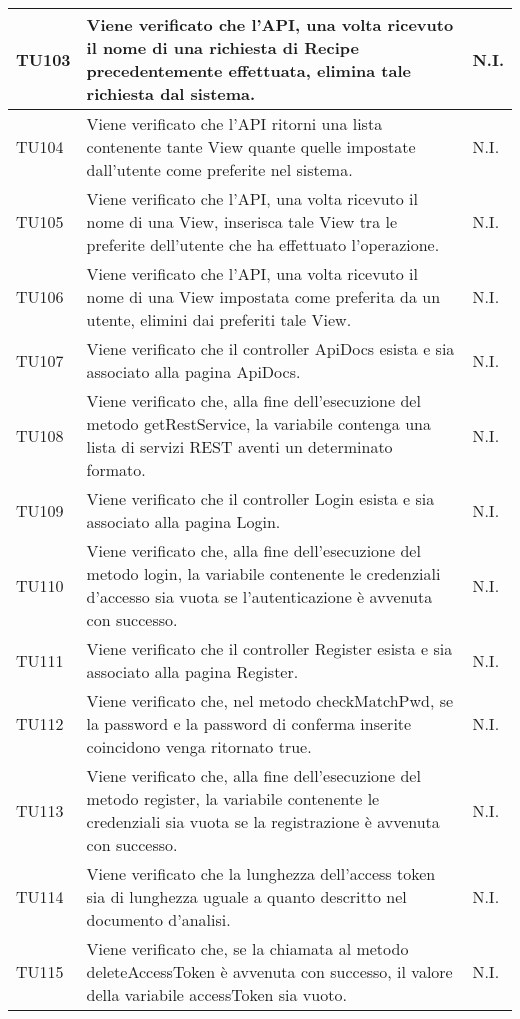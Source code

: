 \begin{center}
\begin{longtable}{| p{2cm} | p{8cm} | p{2.5cm} |}
					\hline
					TU103 & Viene verificato che l'API, una volta ricevuto il nome di una richiesta di Recipe precedentemente effettuata, elimina tale richiesta dal sistema. & N.I.\\
					\hline
					TU104 & Viene verificato che l'API ritorni una lista contenente tante View quante quelle impostate dall'utente come preferite nel sistema. & N.I.\\
					\hline
					TU105 & Viene verificato che l'API, una volta ricevuto il nome di una View, inserisca tale View tra le preferite dell'utente che ha effettuato l'operazione. & N.I.\\
					\hline
					TU106 & Viene verificato che l'API, una volta ricevuto il nome di una View impostata come preferita da un utente, elimini dai preferiti tale View. & N.I.\\
					\hline
					TU107 & Viene verificato che il controller ApiDocs esista e sia associato alla pagina ApiDocs. & N.I.\\
					\hline
					TU108 & Viene verificato che, alla fine dell'esecuzione del metodo getRestService, la variabile contenga una lista di servizi REST aventi un determinato formato. & N.I.\\
					\hline
					TU109 & Viene verificato che il controller Login esista e sia associato alla pagina Login. & N.I.\\
					\hline
					TU110 & Viene verificato che, alla fine dell'esecuzione del metodo login, la variabile contenente le credenziali d'accesso sia vuota se l'autenticazione è avvenuta con successo. & N.I.\\
					\hline
					TU111 & Viene verificato che il controller Register esista e sia associato alla pagina Register. & N.I.\\
					\hline
					TU112 & Viene verificato che, nel metodo checkMatchPwd, se la password e la password di conferma inserite coincidono venga ritornato true. & N.I.\\
					\hline
					TU113 & Viene verificato che, alla fine dell'esecuzione del metodo register, la variabile contenente le credenziali sia vuota se la registrazione è avvenuta con successo. & N.I.\\
					\hline
					TU114 & Viene verificato che la lunghezza dell'access token sia di lunghezza uguale a quanto descritto nel documento d'analisi. & N.I.\\
					\hline
					TU115 & Viene verificato che, se la chiamata al metodo deleteAccessToken è avvenuta con successo, il valore della variabile accessToken sia vuoto. & N.I.\\

\end{longtable}
\end{center}
